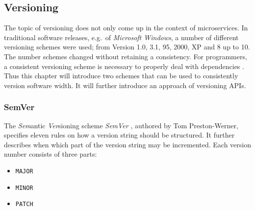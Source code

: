
\subsection{Versioning}%
\label{sub:Versioning}
The topic of versioning does not only come up in the context of microservices.
In traditional software releases, e.g.\ of \textit{Microsoft Windows}, a number
of different versioning schemes were used; from Version 1.0, 3.1, 95, 2000, XP
and 8 up to 10. The number schemes changed without retaining a consistency. For
programmers, a consistent versioning scheme is necessary to properly deal with
dependencies \autocite{Preston-WernerSemanticVersioning2.0.0}. Thus this
chapter will introduce two schemes that can be used to consistently version
software width. It will further introduce an approach of versioning \acp{API}.

\subsubsection{SemVer}%
\label{ssub:SemVer}
The \textit{Sem}antic \textit{Ver}sioning scheme \textit{SemVer}
\autocite{Preston-WernerSemanticVersioning2.0.0}, authored by Tom
Preston-Werner, specifies eleven rules on how a version string should be
structured. It further describes when which part of the version string may be
incremented. Each version number consists of three parts:

\begin{itemize}
  \item \texttt{MAJOR}
  \item \texttt{MINOR}
  \item \texttt{PATCH}
\end{itemize}

